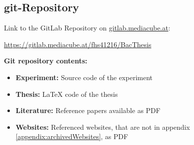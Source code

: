 \begin{appendices}
\section{git-Repository}



Link to the GitLab Repository on {\url{gitlab.mediacube.at}}:

{\color{red}\url{https://gitlab.mediacube.at/fhs41216/BacThesis}}

\textbf{Git repository contents:}

\begin{itemize}
	\item \textbf{Experiment:} Source code of the experiment
	\item \textbf{Thesis:} LaTeX code of the thesis
	\item \textbf{Literature:} Reference papers available as PDF
	\item \textbf{Websites:} Referenced websites, that are not in appendix \ref{appendix:archivedWebsites}, as PDF
\end{itemize}








\end{appendices}
